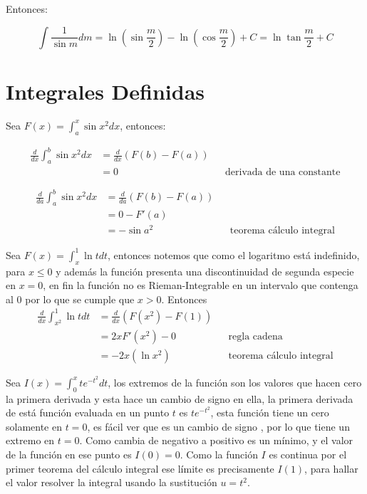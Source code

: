 \documentclass[14pt]{extarticle}
\begin{document}
Entonces:

$$\int \frac{1}{\sin m} dm = \ln(\sin \frac{m}{2}) - \ln(\cos \frac{m}{2}) + C = \ln{\tan{\frac{m}{2}}}+C$$


\section{Integrales Definidas}

Sea $F(x) = \int^x_a \sin x^2 dx $, entonces:

\begin{align}
      \frac{d}{dx} \int^b_a \sin x^2 dx 
      & =   \frac{d}{dx} (F(b)- F(a)) \\
      & = 0 && \text{derivada de una constante} 
\end{align}

\begin{align}
      \frac{d}{da} \int^b_a \sin x^2 dx 
      & =   \frac{d}{da} (F(b)- F(a)) \\
      & = 0 - F'(a) \\
      & = - \sin a^2 && \text{teorema cálculo integral} 
\end{align}

Sea $F(x) = \int^1_x \ln t dt$, entonces notemos que como el logaritmo está indefinido, para $x \leq 0$ y además la función presenta una discontinuidad de segunda especie en $x = 0$, en fin la función no es Rieman-Integrable en un intervalo que contenga al $0$ por lo que se cumple que $x > 0$. Entonces
\begin{align}
      \frac{d}{dx} \int^1_{x^2} \ln t dt 
      & =   \frac{d}{dx} (F(x^2)- F(1)) \\
      & = 2xF'(x^2) - 0  && \text{regla cadena} \\
      & = - 2x(\ln x^2 ) && \text{teorema cálculo integral} 
\end{align}

Sea $ I(x) = \int^x_0 te^{-t^2}dt$, los extremos de la función son los valores que hacen cero la primera derivada y esta hace un cambio de signo en ella, la primera derivada de está función evaluada en un punto $t$ es $te^{-t^2}$, esta función tiene un cero solamente en $t = 0$, es fácil ver que es un cambio de signo , por lo que tiene un extremo en $t = 0$. Como cambia de negativo a positivo es un mínimo, y el valor de la función en ese punto es $I(0) = 0$. Como la función $I$ es continua por el primer teorema del cálculo integral ese límite es precisamente $I(1)$, para hallar el valor resolver la integral usando la sustitución $u = t^2$.
\end{document}
